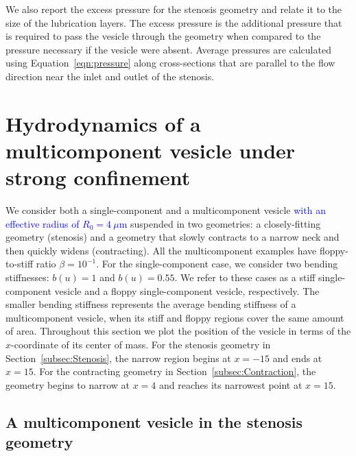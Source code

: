 \documentclass[twoside,twocolumn,9pt]{article}
\begin{document}
We also report the excess pressure for the stenosis geometry and relate
it to the size of the lubrication layers. The excess pressure is the
additional pressure that is required to pass the vesicle through the
geometry when compared to the pressure necessary if the vesicle were
absent. Average pressures are calculated using
Equation~\eqref{eqn:pressure} along cross-sections that are parallel to
the flow direction near the inlet and outlet of the stenosis.

\section{\label{sec:results}Hydrodynamics of a multicomponent vesicle
under strong confinement}
We consider both a single-component and a multicomponent vesicle
\textcolor{blue}{
  with an effective radius of $R_{0} = 4~\mu$m
}
suspended in two geometries: a closely-fitting geometry (stenosis) and a
geometry that slowly contracts to a narrow neck and then quickly widens
(contracting). All the multicomponent examples have floppy-to-stiff
ratio $\beta = 10^{-1}$. For the single-component case, we consider two
bending stiffnesses: $b(u) = 1$ and $b(u) = 0.55$. We refer to these
cases as a stiff single-component vesicle and a floppy single-component
vesicle, respectively. The smaller bending stiffness represents the
average bending stiffness of a multicomponent vesicle, when its stiff
and floppy regions cover the same amount of area. Throughout this
section we plot the position of the vesicle in terms of the
$x$-coordinate of its center of mass. For the stenosis geometry in
Section~\ref{subsec:Stenosis}, the narrow region begins at $x=-15$ and
ends at $x=15$. For the contracting geometry in
Section~\ref{subsec:Contraction}, the geometry begins to narrow at $x=4$
and reaches its narrowest point at $x=15$.


\subsection{\label{subsec:Stenosis}A multicomponent vesicle in the
stenosis geometry}
\end{document}
